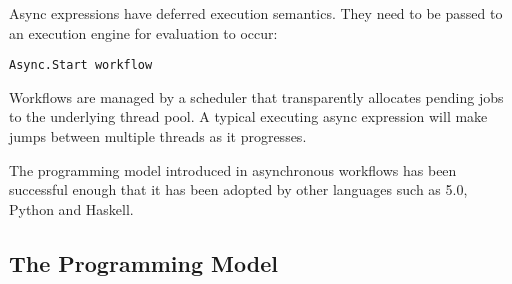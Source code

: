 Async expressions have deferred execution semantics. They need to be passed to an
execution engine for evaluation to occur:
\begin{lstlisting} 
Async.Start workflow
\end{lstlisting}
Workflows are managed by a scheduler that transparently allocates pending jobs to the 
underlying \dotnet{} thread pool. A typical executing async expression will make jumps 
between multiple threads as it progresses.

The programming model introduced in \fsharp{} asynchronous workflows has been successful
enough that it has been adopted by other languages such as \csharp{} 5.0, Python and Haskell.

\subsection{The \TitularMbrace{} Programming Model}

